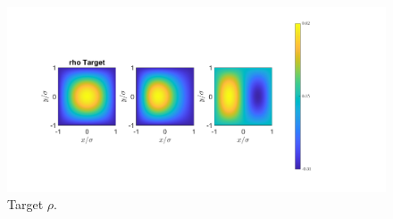 \documentclass[11pt, a4paper]{article}
\theoremstyle{definition}
\begin{document}
	\begin{figure}[h]
		\centering
		\includegraphics[scale=0.35]{FCEx1Target.png}
		\caption{Target $\rho$.} 
		\label{F4b}
	\end{figure}
	
	
	
\end{document}

